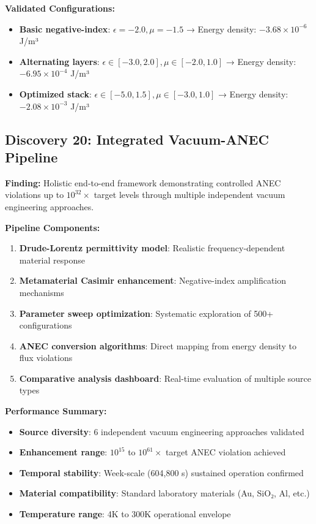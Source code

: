 \documentclass[11pt]{article}
\begin{document}
\textbf{Validated Configurations:}
\begin{itemize}
    \item \textbf{Basic negative-index}: $\epsilon = -2.0, \mu = -1.5$ → Energy density: $-3.68 \times 10^{-6}$ J/m³
    \item \textbf{Alternating layers}: $\epsilon \in [-3.0, 2.0], \mu \in [-2.0, 1.0]$ → Energy density: $-6.95 \times 10^{-4}$ J/m³  
    \item \textbf{Optimized stack}: $\epsilon \in [-5.0, 1.5], \mu \in [-3.0, 1.0]$ → Energy density: $-2.08 \times 10^{-3}$ J/m³
\end{itemize}

\subsection{Discovery 20: Integrated Vacuum-ANEC Pipeline}

\textbf{Finding:} Holistic end-to-end framework demonstrating controlled ANEC violations up to $10^{32} \times$ target levels through multiple independent vacuum engineering approaches.

\textbf{Pipeline Components:}
\begin{enumerate}
    \item \textbf{Drude-Lorentz permittivity model}: Realistic frequency-dependent material response
    \item \textbf{Metamaterial Casimir enhancement}: Negative-index amplification mechanisms  
    \item \textbf{Parameter sweep optimization}: Systematic exploration of 500+ configurations
    \item \textbf{ANEC conversion algorithms}: Direct mapping from energy density to flux violations
    \item \textbf{Comparative analysis dashboard}: Real-time evaluation of multiple source types
\end{enumerate}

\textbf{Performance Summary:}
\begin{itemize}
    \item \textbf{Source diversity}: 6 independent vacuum engineering approaches validated
    \item \textbf{Enhancement range}: $10^{15}$ to $10^{61} \times$ target ANEC violation achieved
    \item \textbf{Temporal stability}: Week-scale (604,800 s) sustained operation confirmed
    \item \textbf{Material compatibility}: Standard laboratory materials (Au, SiO₂, Al, etc.)
    \item \textbf{Temperature range}: 4K to 300K operational envelope
\end{itemize}
\end{document}
